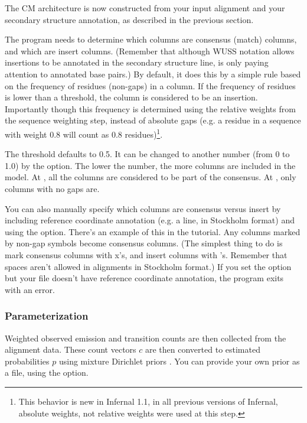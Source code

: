 The CM architecture is now constructed from your input alignment and
your secondary structure annotation, as described in the previous
section. 

The program needs to determine which columns are consensus (match)
columns, and which are insert columns. (Remember that although WUSS
notation allows insertions to be annotated in the secondary structure
line,  is only paying attention to annotated base
pairs.) By default, it does this by a simple rule based on the
frequency of residues (non-gaps) in a column. If the frequency of
residues is lower than a threshold, the column is considered to be
an insertion. Importantly though this frequency is determined using
the relative weights from the sequence weighting step, instead of
absolute gaps (e.g. a residue in a sequence with weight $0.8$ will count
as $0.8$ residues)\footnote{This behavior is new in Infernal 1.1, in all
previous versions of Infernal, absolute weights, not relative weights
were used at this step.}.

The threshold defaults to 0.5. It can be changed to another number
 (from 0 to 1.0) by the  option.  The
lower the number, the more columns are included in the model.  At
, all the columns are considered to be part of
the consensus. At , only columns with no gaps are.

You can also manually specify which columns are consensus versus
insert by including reference coordinate annotation (e.g. a
 line, in Stockholm format) and using the
 option. There's an example of this in the tutorial. Any
columns marked by non-gap symbols become consensus columns. (The
simplest thing to do is mark consensus columns with x's, and insert
columns with 's. Remember that spaces aren't allowed in
alignments in Stockholm format.) If you set the  option but
your file doesn't have reference coordinate annotation, the program
exits with an error.

\subsubsection{Parameterization}

Weighted observed emission and transition counts are then collected
from the alignment data. These count vectors $c$ are then converted to
estimated probabilities $p$ using mixture Dirichlet priors
\citep{Sjolander96, Durbin98, NawrockiEddy07}. You can provide your
own prior as a file, using the  option.

